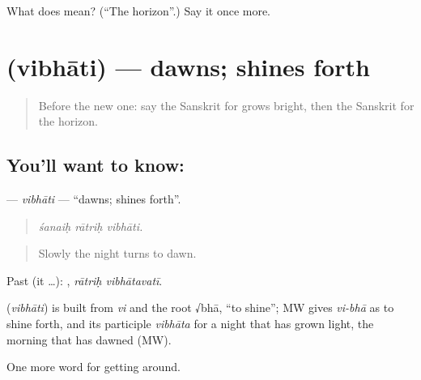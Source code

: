 \begin{tcolorbox}[breakable,colback=teal!4,colframe=teal!35!black,title={Before you move on}]
What does  mean? (\textquotedblleft{}The horizon\textquotedblright{}.) Say it once more.
\end{tcolorbox}
\section[\texorpdfstring{\sk{विभाति} (vibhāti)}{विभाति (vibhāti)}]{ (vibhāti) — dawns; shines forth}

\label{lesson:SA-C442-vibhati}



\begin{quote}
Before the new one: say the Sanskrit for grows bright, then the Sanskrit for the horizon.
\end{quote}

\subsection*{You'll want to know: }
\textbf{} — \emph{vibhāti} — \textquotedblleft{}dawns; shines forth\textquotedblright{}.

\begin{quote}
  
\end{quote}

\begin{quote}
\emph{śanaiḥ rātriḥ vibhāti.}
\end{quote}

\begin{quote}
Slowly the night turns to dawn.
\end{quote}

Past (it …):  , \emph{rātriḥ vibhātavatī}.

\begin{cousinweb}
\textbf{} (\emph{vibhāti}) is built from \emph{vi} and the root √bhā, \textquotedblleft{}to shine\textquotedblright{}; MW gives \emph{vi-bhā} as to shine forth, and its participle \emph{vibhāta} for a night that has grown light, the morning that has dawned (MW).
\end{cousinweb}

\begin{grammarlens}[title={What you've built}]
One more word for getting around.
\end{grammarlens}

